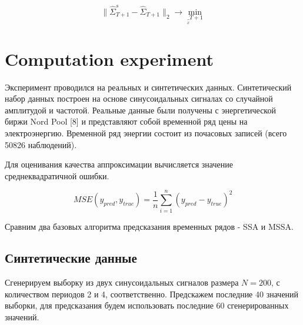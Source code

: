 \documentclass{article}
\begin{document}
\begin{equation}
    \| \hat{\Sigma}_{T+1}^s - \hat{\Sigma}_{T+1} \|_2 \to \min_{\underset x_{T+1}}
\end{equation}






\section{Computation experiment}

Эксперимент проводился на реальных и синтетических данных. Синтетический набор данных построен на основе синусоидальных сигналах со случайной амплитудой и частотой. Реальные данные были получены с энергетической биржи Nord Pool [8] и представляют собой временной ряд цены на электроэнергию. Временной ряд энергии состоит из почасовых записей (всего 50826 наблюдений). 

Для оценивания качества аппроксимации вычисляется значение среднеквадратичной ошибки.

\begin{equation}
MSE(y_{pred}, y_{true}) = \frac{1}{n} \sum_{i=1}^n (y_{pred} - y_{true})^2
\end{equation}

Сравним два базовых алгоритма предсказания временных рядов - SSA и MSSA.

\subsection{Синтетические данные}

Сгенерируем выборку из двух синусоидальных сигналов размера $N = 200$, с количеством периодов 2 и 4, соответственно. Предскажем последние 40 значений выборки, для предсказания будем использовать последние 60 сгенерированных значений.\\
\end{document}
